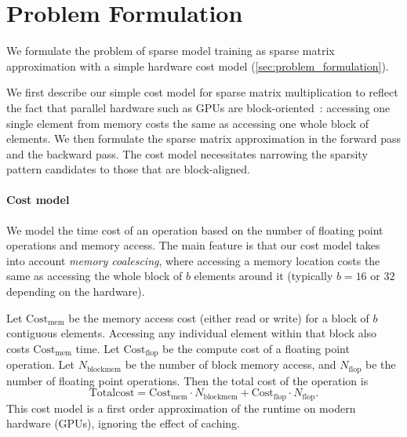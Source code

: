 \section{Problem Formulation}
\label{app:problem_formulation}

We formulate the problem of sparse model training as sparse matrix approximation with a simple hardware cost model (\cref{sec:problem_formulation}).





We first describe our simple cost model for sparse matrix multiplication to reflect the fact that parallel hardware such as GPUs are block-oriented~\citep{cook2012cuda,gray2017gpu}: accessing one single element from memory costs the same as accessing one whole block of elements.
We then formulate the sparse matrix approximation in the forward pass and the backward pass.
The cost model necessitates narrowing the sparsity pattern candidates to those that are block-aligned.

\paragraph{Cost model}
We model the time cost of an operation based on the number of floating point operations and memory access.
The main feature is that our cost model takes into account \emph{memory coalescing}, where accessing a memory location costs the same as accessing the whole block of $b$ elements around it (typically $b = 16 \text{ or } 32$ depending on the hardware).

Let $\mathrm{Cost}_\mathrm{mem}$ be the memory access cost (either read or write) for a block of $b$ contiguous elements.
Accessing any individual element within that block also costs $\mathrm{Cost}_\mathrm{mem}$ time.
Let $\mathrm{Cost}_\mathrm{flop}$ be the compute cost of a floating point operation.
Let $N_\mathrm{block mem}$ be the number of block memory access, and $N_\mathrm{flop}$ be the number of floating point operations.
Then the total cost of the operation is
\begin{equation*}
  \mathrm{Total cost} = \mathrm{Cost}_\mathrm{mem} \cdot N_\mathrm{block mem} + \mathrm{Cost}_\mathrm{flop} \cdot N_\mathrm{flop}.
\end{equation*}
This cost model is a first order approximation of the runtime on modern hardware (GPUs), ignoring the effect of caching.

